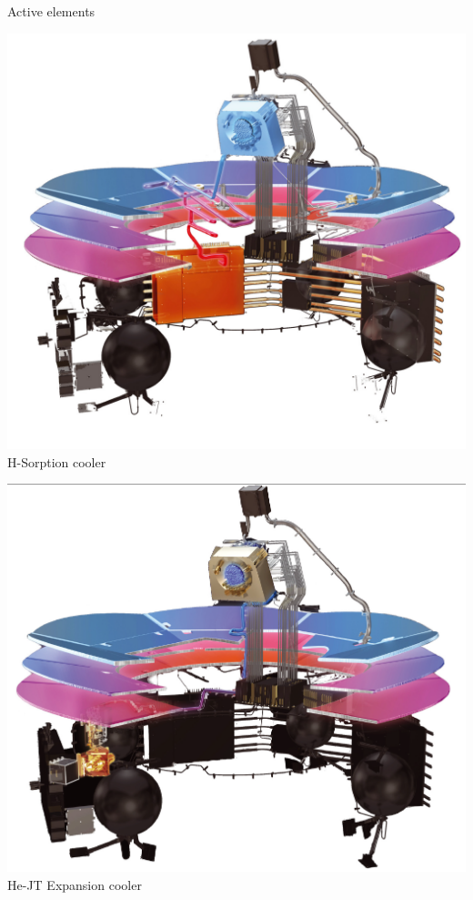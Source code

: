 \begin{frame}{Active elements}
\begin{minipage}{0.3\textwidth}
    \includegraphics[width=0.9\linewidth]{Figures/H_sorption_cooler.png} 
    \small \centering  H-Sorption cooler
\end{minipage}
\begin{minipage}{0.3\textwidth}
    \includegraphics[width=0.9\linewidth]{Figures/He_JT_cooler.png} 
    \small \centering  He-JT Expansion cooler
\end{minipage}
\begin{minipage}{0.3\textwidth}

\end{minipage}
\end{frame}
